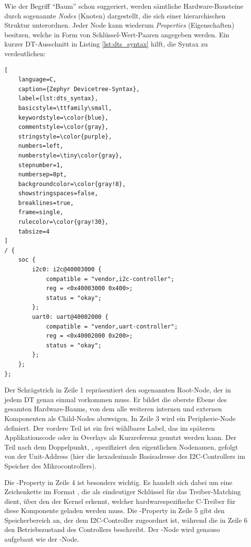 Wie der Begriff \enquote{Baum} schon suggeriert, werden sämtliche Hardware-Bausteine durch sogenannte \emph{Nodes} (Knoten) dargestellt, die sich
einer hierarchischen Struktur unterordnen. Jeder Node kann wiederum \emph{Properties} (Eigenschaften) besitzen, welche
in Form von Schlüssel-Wert-Paaren angegeben werden. Ein kurzer DT-Ausschnitt in Listing \ref{lst:dts_syntax} hilft, die Syntax 
zu verdeutlichen: 

\begin{lstlisting}[
    language=C,
    caption={Zephyr Devicetree-Syntax},
    label={lst:dts_syntax},
    basicstyle=\ttfamily\small,
    keywordstyle=\color{blue},
    commentstyle=\color{gray},
    stringstyle=\color{purple},
    numbers=left,
    numberstyle=\tiny\color{gray},
    stepnumber=1,
    numbersep=8pt,
    backgroundcolor=\color{gray!8},
    showstringspaces=false,
    breaklines=true,
    frame=single,
    rulecolor=\color{gray!30},
    tabsize=4
]
/ {
    soc {
        i2c0: i2c@40003000 {
            compatible = "vendor,i2c-controller";
            reg = <0x40003000 0x400>;
            status = "okay";
        };
        uart0: uart@40002000 {
            compatible = "vendor,uart-controller";
            reg = <0x40002000 0x200>;
            status = "okay";
        };
    };
};
\end{lstlisting}

Der Schrägstrich \codebox{/} in Zeile 1 repräsentiert den sogenannten Root-Node, der in jedem DT genau einmal vorkommen muss. 
Er bildet die oberste Ebene des gesamten Hardware-Baums, von dem alle weiteren internen und externen 
Komponenten als Child-Nodes abzweigen. In Zeile 3  wird ein Peripherie-Node definiert. 
Der vordere Teil  ist ein frei wählbares Label, das im späteren Applikationscode oder 
in Overlays als Kurzreferenz genutzt werden kann. Der Teil nach dem Doppelpunkt, , 
spezifiziert den eigentlichen Nodenamen, gefolgt von der Unit-Address (hier die hexadezimale Basisadresse des I2C-Controllers 
im Speicher des Mikrocontrollers).

Die -Property in Zeile 4 ist besonders wichtig. 
Es handelt sich dabei um eine Zeichenkette im Format ,
die als eindeutiger Schlüssel für das Treiber-Matching dient, über den der Kernel erkennt, welcher hardwarespezifische C-Treiber 
für diese Komponente geladen werden muss. Die -Property in Zeile 5 gibt den Speicherbereich an, 
der dem I2C-Controller zugeordnet ist, während die  in Zeile 6 den Betriebszustand des Controllers beschreibt.
Der -Node wird genauso aufgebaut wie der -Node. 

